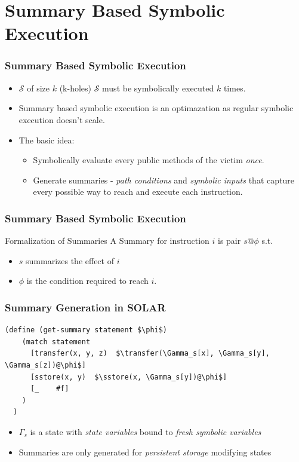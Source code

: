 \documentclass{beamer}
\newcommand{\transfer}{\overline{\textit{transfer}}}
\newcommand{\sstore}{\overline{\textit{sstore}}}
\begin{document}
\section{Summary Based Symbolic Execution}
\begin{frame}
  \frametitle{Summary Based Symbolic Execution}
  \begin{itemize}
    \item $\mathcal{S}$ of size $k$ (k-holes)
      $\mathcal{S}$ must be symbolically executed $k$ times.
    \item Summary based symbolic execution is an optimazation
      as regular symbolic execution doesn't scale.
    \item The basic idea:
      \begin{itemize}
        \item Symbolically evaluate every public methods of
          the victim \textit{once}.
        \item Generate summaries - \textit{path conditions} and
          \textit{symbolic inputs} that capture every possible
          way to reach and execute each instruction.
       \end{itemize}
      \end{itemize}
\end{frame}

\begin{frame}
  \frametitle{Summary Based Symbolic Execution}
  \begin{block}{Formalization of Summaries}
    A Summary for instruction $i$ is pair $s@\phi$ s.t.
    \begin{itemize}
      \item $s$ summarizes the effect of $i$
      \item $\phi$ is the condition required to reach $i$.
    \end{itemize}
  \end{block}
\end{frame}

\begin{frame}[fragile]
  \frametitle{Summary Generation in SOLAR}
  \begin{center}
  \begin{lstlisting}[language=Racket, numbers=none]
  (define (get-summary statement $\phi$)
    (match statement
      [transfer(x, y, z)  $\transfer(\Gamma_s[x], \Gamma_s[y], \Gamma_s[z])@\phi$]
      [sstore(x, y)  $\sstore(x, \Gamma_s[y])@\phi$]
      [_    #f]
    )
  )
  \end{lstlisting}
  \end{center}
  \begin{itemize}
    \item $\Gamma_s$ is a state with \textit{state variables} bound to
      \textit{fresh symbolic variables}
    \item Summaries are only generated for \textit{persistent storage}
      modifying states
  \end{itemize}
\end{frame}
\end{document}
